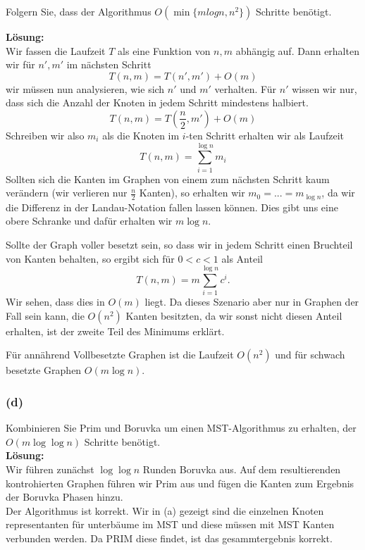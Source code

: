 \documentclass[11pt,a4paper,ngerman]{article}
\begin{document}
Folgern Sie, dass der Algorithmus $O(\min \{ m log n, n^2 \})$ Schritte benötigt.

\textbf{Lösung:}\\

Wir fassen die Laufzeit $T$ als eine Funktion von $n,m$ abhängig auf.
Dann erhalten wir für $n',m'$ im nächsten Schritt
$$
    T(n,m) = T(n',m') + O(m)
$$
wir müssen nun analysieren, wie sich $n'$ und $m'$ verhalten. Für $n'$ wissen
wir nur, dass sich die Anzahl der Knoten in jedem Schritt mindestens halbiert.
$$
    T(n,m) = T(\frac{n}{2}, m') + O(m)
$$
Schreiben wir also $m_i$ als die Knoten im $i$-ten Schritt erhalten wir als Laufzeit
$$
    T(n,m) = \overset{\log n}{\underset{i = 1}{\sum}} m_i
$$
Sollten sich die Kanten im Graphen von einem zum nächsten Schritt kaum verändern (wir verlieren nur $\frac{n}{2}$ Kanten),
so erhalten wir $m_0 = ... = m_{\log n}$, da wir die Differenz in der Landau-Notation fallen lassen können. Dies gibt uns eine obere Schranke und
dafür erhalten wir $m \log n$. 

Sollte der Graph voller besetzt sein, so dass wir in jedem Schritt einen Bruchteil von Kanten behalten,
so ergibt sich für $0 < c < 1$ als Anteil
$$
    T(n,m) = m \overset{\log n}{\underset{i = 1}{\sum}} c^i.
$$
Wir sehen, dass dies in $O(m)$ liegt. Da dieses Szenario aber nur in Graphen der Fall sein kann, die $O(n^2)$ Kanten besitzten,
da wir sonst nicht diesen Anteil erhalten, ist der zweite Teil des Minimums erklärt.

Für annährend Vollbesetzte Graphen ist die Laufzeit $O(n^2)$ und für schwach besetzte Graphen $O(m \log n)$.

\subsubsection*{(d)}

Kombinieren Sie Prim und Boruvka um einen MST-Algorithmus zu erhalten, der $O(m \log \log n)$ Schritte benötigt.\\

\textbf{Lösung:}\\

Wir führen zunächst $\log \log n$ Runden Boruvka aus. Auf dem resultierenden kontrohierten Graphen führen wir
Prim aus und fügen die Kanten zum Ergebnis der Boruvka Phasen hinzu.\\

Der Algorithmus ist korrekt. Wir in (a) gezeigt sind die einzelnen Knoten representanten für unterbäume im MST und diese
müssen mit MST Kanten verbunden werden. Da PRIM diese findet, ist das gesammtergebnis korrekt.\\
\end{document}

